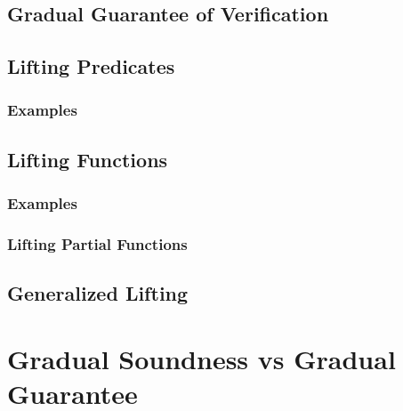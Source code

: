     \subsection{Gradual Guarantee of Verification}
    \label{ssec:gfconclusion}
    

    \subsection{Lifting Predicates}
    \label{ssec:lifting-predicates}
    
    
        \subsubsection{Examples}
        \label{sssec:examples-lift-predicates}
        
    
    \subsection{Lifting Functions}
    \label{ssec:lifting-functions}
    
    
        \subsubsection{Examples}
        \label{sssec:examples-lift-functions}
        
        
        \subsubsection{Lifting Partial Functions}
        \label{sssec:lifting-partial-functions}
        
    
    \subsection{Generalized Lifting}
    \label{ssec:generalized-lifting}
    

\section{Gradual Soundness vs Gradual Guarantee}
\label{ssec:gradual-soundness}


